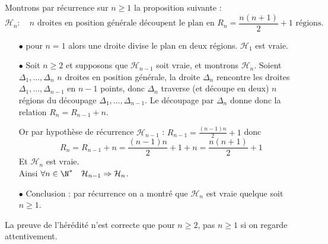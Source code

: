 \begin{Soln}{35}
Montrons par r\'ecurrence sur $n \geqslant 1$ la proposition suivante :
$$\mathcal{H}_n :  \quad n \text{\  droites en position g\'en\'erale d\'ecoupent le plan en \ } R_n = \frac{n(n+1)}{2}+1
\text{\  r\'egions.}$$

\begin{itemize}
\item[$\bullet$] pour $n=1$ alors une droite divise le plan en deux r\'egions. $\mathcal{H}_1$ est vraie.

\item[$\bullet$] Soit $n\geqslant 2$ et supposons que $\mathcal{H}_{n-1}$ soit vraie, et montrons $\mathcal{H}_n$.
Soient $\Delta_1,\ldots,\Delta_n$ $n$ droites en position
g\'en\'erale, la droite $\Delta_n$ rencontre les droites
$\Delta_1,\ldots,\Delta_{n-1}$ en $n-1$ points, donc $\Delta_n$
traverse (et d\'ecoupe en deux) $n$ r\'egions du d\'ecoupage
$\Delta_1,\ldots,\Delta_{n-1}$. Le d\'ecoupage par $\Delta_n$
donne donc la relation $R_n=R_{n-1}+n$.

Or par hypoth\`ese de r\'ecurrence $\mathcal{H}_{n-1}$ : $R_{n-1}
= \frac{(n-1)n}{2}+1$ donc
$$  R_n = R_{n-1}+n =  \frac{(n-1)n}{2}+1+n=\frac{n(n+1)}{2}+1 $$
Et $\mathcal{H}_n$ est vraie.\\
Ainsi $\forall n\in\N^* \quad \mathcal{H}_{n-1}\Rightarrow
\mathcal{H}_{n}$.

\item[$\bullet$] Conclusion :  par r\'ecurrence on a montr\'e que $\mathcal{H}_n$ est vraie quelque soit $n \geqslant 1$.

\end{itemize}
\end{Soln}
\begin{Soln}{36}
La preuve de l'hérédité n'est correcte que pour $n\geq 2$, pas $n\geq 1$ si on regarde attentivement.
\end{Soln}
